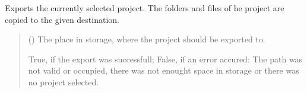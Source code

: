 \documentclass[letterpaper,10pt,english]{sphinxmanual}
\begin{document}
\begin{fulllineitems}
\begin{fulllineitems}
\begin{quote}
\begin{description}
\sphinxAtStartPar
{}

\end{description}\end{quote}

\end{fulllineitems}


\begin{fulllineitems}
\label{\detokenize{apidoc/src.osm_configurator.control:src.osm_configurator.control.control.Control.export_project}}
\pysigstartsignatures
{}
\pysigstopsignatures
\sphinxAtStartPar
Exports the currently selected project.
The folders and files of he project are copied to the given destination.
\begin{quote}\begin{description}
\sphinxAtStartPar
{} () \textendash{} The place in storage, where the project should be exported to.

\sphinxAtStartPar
True, if the export was successfull; False, if an error accured: The path was not valid or occupied, there was not enought space in storage or there was no project selected.

\sphinxAtStartPar
{}

\end{description}\end{quote}

\end{fulllineitems}



\end{fulllineitems}
\end{document}
